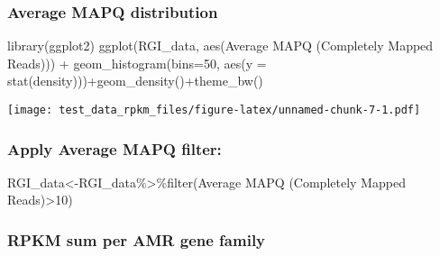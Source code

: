 \documentclass[
]{article}
\newenvironment{Shaded}{\begin{snugshade}}{\end{snugshade}}
\newcommand{\AttributeTok}[1]{\textcolor[rgb]{0.77,0.63,0.00}{#1}}
\newcommand{\DecValTok}[1]{\textcolor[rgb]{0.00,0.00,0.81}{#1}}
\newcommand{\FunctionTok}[1]{\textcolor[rgb]{0.00,0.00,0.00}{#1}}
\newcommand{\NormalTok}[1]{#1}
\newcommand{\OtherTok}[1]{\textcolor[rgb]{0.56,0.35,0.01}{#1}}
\newcommand{\SpecialCharTok}[1]{\textcolor[rgb]{0.00,0.00,0.00}{#1}}
\newcommand{\StringTok}[1]{\textcolor[rgb]{0.31,0.60,0.02}{#1}}
\begin{document}
\hypertarget{average-mapq-distribution}{%
\subsubsection{Average MAPQ
distribution}\label{average-mapq-distribution}}

\begin{Shaded}
\begin{Highlighting}[]
\FunctionTok{library}\NormalTok{(ggplot2)}
\FunctionTok{ggplot}\NormalTok{(RGI\_data, }\FunctionTok{aes}\NormalTok{(}\StringTok{\textasciigrave{}}\AttributeTok{Average MAPQ (Completely Mapped Reads)}\StringTok{\textasciigrave{}}\NormalTok{)) }\SpecialCharTok{+}
  \FunctionTok{geom\_histogram}\NormalTok{(}\AttributeTok{bins=}\DecValTok{50}\NormalTok{, }\FunctionTok{aes}\NormalTok{(}\AttributeTok{y =} \FunctionTok{stat}\NormalTok{(density)))}\SpecialCharTok{+}\FunctionTok{geom\_density}\NormalTok{()}\SpecialCharTok{+}\FunctionTok{theme\_bw}\NormalTok{()}
\end{Highlighting}
\end{Shaded}

\texttt{[image: test\_data\_rpkm\_files/figure-latex/unnamed-chunk-7-1.pdf]}

\hypertarget{apply-average-mapq-filter}{%
\subsubsection{Apply Average MAPQ
filter:}\label{apply-average-mapq-filter}}

\begin{Shaded}
\begin{Highlighting}[]
\NormalTok{RGI\_data}\OtherTok{\textless{}{-}}\NormalTok{RGI\_data}\SpecialCharTok{\%\textgreater{}\%}\FunctionTok{filter}\NormalTok{(}\StringTok{\textasciigrave{}}\AttributeTok{Average MAPQ (Completely Mapped Reads)}\StringTok{\textasciigrave{}}\SpecialCharTok{\textgreater{}}\DecValTok{10}\NormalTok{)}
\end{Highlighting}
\end{Shaded}

\hypertarget{rpkm-sum-per-amr-gene-family}{%
\subsubsection{RPKM sum per AMR gene
family}\label{rpkm-sum-per-amr-gene-family}}

\begin{Shaded}
\end{Shaded}
\end{document}
